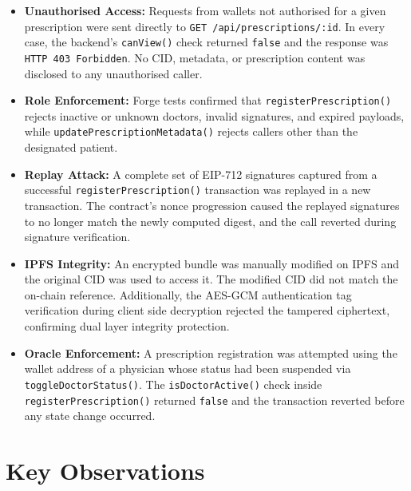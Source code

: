 \documentclass[12pt,a4wide]{report}
\begin{document}
\begin{itemize}
  \item \textbf{Unauthorised Access:} Requests from wallets not authorised for
    a given prescription were sent directly to \texttt{GET /api/prescriptions/:id}.
    In every case, the backend's \texttt{canView()} check returned \texttt{false}
    and the response was \texttt{HTTP 403 Forbidden}. No CID, metadata, or
    prescription content was disclosed to any unauthorised caller.
  \item \textbf{Role Enforcement:} Forge tests confirmed that
    \texttt{registerPrescription()} rejects inactive or unknown doctors, invalid
    signatures, and expired payloads, while \texttt{updatePrescriptionMetadata()}
    rejects callers other than the designated patient.
  \item \textbf{Replay Attack:} A complete set of EIP-712 signatures captured from
    a successful \texttt{registerPrescription()} transaction was replayed in a new
    transaction. The contract's nonce progression caused the replayed signatures
    to no longer match the newly computed digest, and the call reverted during
    signature verification.
  \item \textbf{IPFS Integrity:} An encrypted bundle was manually modified on IPFS
    and the original CID was used to access it. The modified CID did not match the
    on-chain reference. Additionally, the AES-GCM authentication tag verification
    during client side decryption rejected the tampered ciphertext, confirming
    dual layer integrity protection.
  \item \textbf{Oracle Enforcement:} A prescription registration was attempted
    using the wallet address of a physician whose status had been suspended via
    \texttt{toggleDoctorStatus()}. The \texttt{isDoctorActive()} check inside
    \texttt{registerPrescription()} returned \texttt{false} and the transaction
    reverted before any state change occurred.
\end{itemize}

\section{Key Observations}
\end{document}
